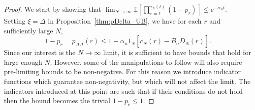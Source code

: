 \documentclass[12pt,authoryear]{article}
\theoremstyle{definition}
\newcommand{\E}{\mathbb{E}}
\newcommand{\1}[1]{\mathbbm{1}_{#1}}
\newcommand{\ON}{1_N}
\begin{document}
\begin{proof}
We start by showing that
$\lim_{N\to\infty}\E[ \prod_{r=1}^{\tau_N(t)} (1-p_r) ] 
\leq e^{-\alpha_n t}$.\\
Setting $\xi=\Delta$ in Proposition~\ref{thm:pDelta_UB}, we have for each $r$ and sufficiently large $N$,
\begin{equation} \label{eq:018}
1-p_r
= p_{\Delta\Delta}(r) 
\leq 1 - \alpha_n \ON
        \left[ c_N(r) - B_n^\prime D_N(r) \right] .
\end{equation}
Since our interest is the $N\to\infty$ limit, it is sufficient to have bounds that hold for large enough $N$. However, some of the manipulations to follow will also require pre-limiting bounds to be non-negative.
For this reason we introduce indicator functions which guarantee non-negativity, but which will not affect the limit.
The indicators introduced at this point are such that if their conditions do not hold then the bound becomes the trivial $1-p_r \leq 1$.
 

\end{proof}
\end{document}
